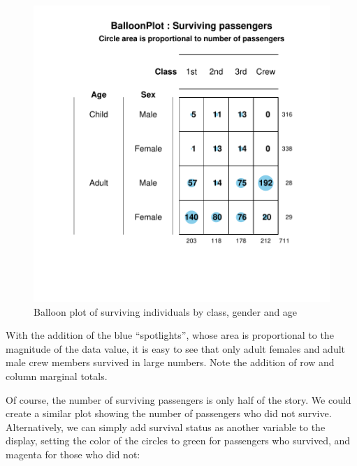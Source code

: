 \documentclass[a4paper]{report}
\begin{document}
\begin{article}
\begin{figure}
\includegraphics[width=\textwidth]{Figure2.pdf}
\caption{\label{figure:Figure2}
Balloon plot of surviving individuals by class, gender and age }
\end{figure}

With the addition of the blue ``spotlights'', whose area is
proportional to the magnitude of the data value, it is easy to see
that only adult females and adult male crew members survived in
large numbers.  Note the addition of row and column marginal
totals.

Of course, the number of surviving passengers is only half of the
story.  We could create a similar plot showing the number of
passengers who did not survive.  Alternatively, we can simply add
survival status as another variable to the display, setting the color
of the circles to green for passengers who survived, and magenta for
those who did not:


\end{article}
\end{document}
